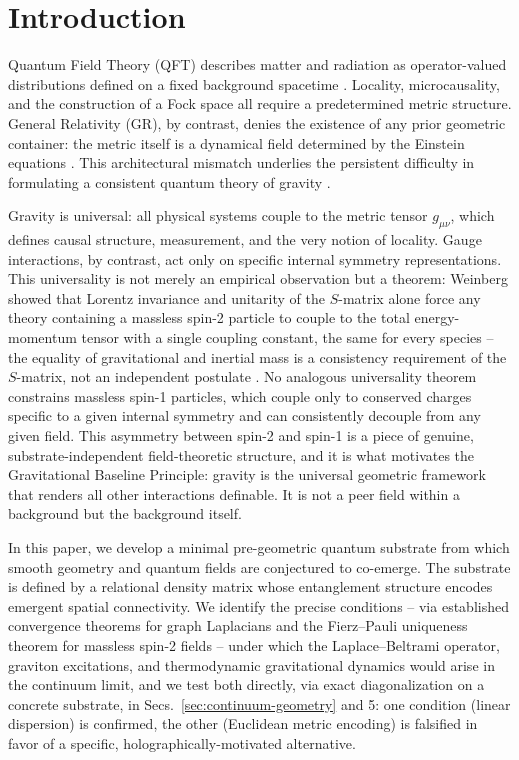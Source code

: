 \documentclass[11pt]{article}
\begin{document}
\section{Introduction}

Quantum Field Theory (QFT) describes matter and radiation as operator-valued distributions defined on a fixed background spacetime \cite{Dirac}. Locality, microcausality, and the construction of a Fock space all require a predetermined metric structure. General Relativity (GR), by contrast, denies the existence of any prior geometric container: the metric itself is a dynamical field determined by the Einstein equations \cite{Einstein}. This architectural mismatch underlies the persistent difficulty in formulating a consistent quantum theory of gravity \cite{DeWitt}.

Gravity is universal: all physical systems couple to the metric tensor $g_{\mu\nu}$, which defines causal structure, measurement, and the very notion of locality. Gauge interactions, by contrast, act only on specific internal symmetry representations. This universality is not merely an empirical observation but a theorem: Weinberg showed that Lorentz invariance and unitarity of the $S$-matrix alone force any theory containing a massless spin-2 particle to couple to the total energy-momentum tensor with a single coupling constant, the same for every species -- the equality of gravitational and inertial mass is a consistency requirement of the $S$-matrix, not an independent postulate \cite{Weinberg}. No analogous universality theorem constrains massless spin-1 particles, which couple only to conserved charges specific to a given internal symmetry and can consistently decouple from any given field. This asymmetry between spin-2 and spin-1 is a piece of genuine, substrate-independent field-theoretic structure, and it is what motivates the Gravitational Baseline Principle: gravity is the universal geometric framework that renders all other interactions definable. It is not a peer field within a background but the background itself.

In this paper, we develop a minimal pre-geometric quantum substrate from which smooth geometry and quantum fields are conjectured to co-emerge. The substrate is defined by a relational density matrix whose entanglement structure encodes emergent spatial connectivity. We identify the precise conditions -- via established convergence theorems for graph Laplacians and the Fierz--Pauli uniqueness theorem for massless spin-2 fields -- under which the Laplace--Beltrami operator, graviton excitations, and thermodynamic gravitational dynamics would arise in the continuum limit, and we test both directly, via exact diagonalization on a concrete substrate, in Secs.~\ref{sec:continuum-geometry} and 5: one condition (linear dispersion) is confirmed, the other (Euclidean metric encoding) is falsified in favor of a specific, holographically-motivated alternative.
\end{document}
